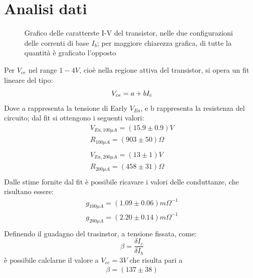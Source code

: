 \documentclass{article}
\begin{document}
\section{Analisi dati}
\begin{figure}[H]
    \begin{center}
        \scalebox{0.7}{}
        \caption{\label{fig:multigraph}Grafico delle caratterste I-V del transistor, nelle due configurazioni delle correnti di base $I_b$; per maggiore chiarezza grafica, di tutte la quantità è graficato l'opposto}
    \end{center}
\end{figure}
Per $V_{ce}$ nel range $1-4 V$, cioè nella regione attiva del transistor, si opera un fit lineare del tipo:
\begin{equation}
    V_{ce} = a + b I_c\\
\end{equation}
Dove a rappresenta la tensione di Early $V_{Ea}$, e b rappresenta la resistenza del circuito; dal fit si ottengono i seguenti valori:
\begin{equation}
    \begin{aligned}
        V_{Ea,100\mu A}=(15.9\pm 0.9) V  \\
        R_{100\mu A}=(903 \pm 50) \Omega \\
        \\
        V_{Ea,200\mu A}=(13\pm 1) V      \\
        R_{200\mu A}=(458 \pm 31) \Omega \\
    \end{aligned}
\end{equation}
Dalle stime fornite dal fit è possibile ricavare i valori delle conduttanze, che risultano essere:
\begin{equation}
    \begin{aligned}
        g_{100 \mu A}=(1.09 \pm 0.06) m\Omega^{-1} \\
        g_{200 \mu A}=(2.20 \pm 0.14) m\Omega^{-1} \\
    \end{aligned}
\end{equation}
Definendo il guadagno del trasinstor, a tensione fissata, come:
\begin{equation}
    \beta= \frac{\delta I_c}{\delta I_b}
\end{equation}
è possibile calclarne il valore a $V_{ce}=3 V$ che risulta pari a
\begin{equation}
    \begin{aligned}
        \beta=(137\pm38)
    \end{aligned}
\end{equation}
\end{document}
